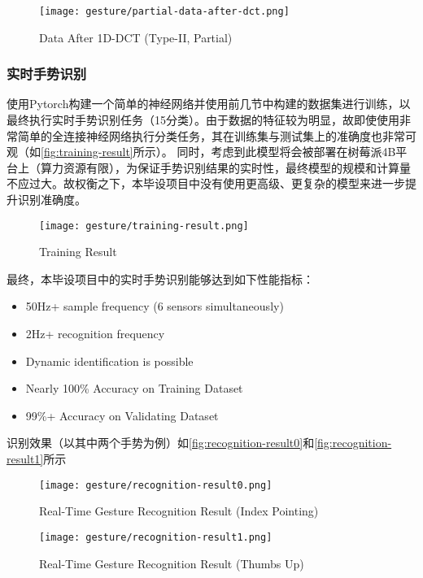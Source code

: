 \begin{figure}[H]
    \centering
    \texttt{[image: gesture/partial-data-after-dct.png]}
    \caption{\label{fig:partial-data-after-dct}Data After 1D-DCT (Type-II, Partial)}
\end{figure}

\subsubsection{实时手势识别}
使用Pytorch构建一个简单的神经网络并使用前几节中构建的数据集进行训练，以最终执行实时手势识别任务（15分类）。由于数据的特征较为明显，故即使使用非常简单的全连接神经网络执行分类任务，其在训练集与测试集上的准确度也非常可观（如\autoref{fig:training-result}所示）。
同时，考虑到此模型将会被部署在树莓派4B平台上（算力资源有限），为保证手势识别结果的实时性，最终模型的规模和计算量不应过大。故权衡之下，本毕设项目中没有使用更高级、更复杂的模型来进一步提升识别准确度。

\begin{figure}[H]
    \centering
    \texttt{[image: gesture/training-result.png]}
    \caption{\label{fig:training-result}Training Result}
\end{figure}

最终，本毕设项目中的实时手势识别能够达到如下性能指标：
\begin{itemize}
    \item 50Hz+ sample frequency (6 sensors simultaneously)
    \item 2Hz+ recognition frequency
    \item Dynamic identification is possible
    \item Nearly 100\% Accuracy on Training Dataset
    \item 99\%+ Accuracy on Validating Dataset
\end{itemize}

识别效果（以其中两个手势为例）如\autoref{fig:recognition-result0}和\autoref{fig:recognition-result1}所示

\begin{figure}[H]
    \centering
    \texttt{[image: gesture/recognition-result0.png]}
    \caption{\label{fig:recognition-result0}Real-Time Gesture Recognition Result (Index Pointing)}
\end{figure}

\begin{figure}[H]
    \centering
    \texttt{[image: gesture/recognition-result1.png]}
    \caption{\label{fig:recognition-result1}Real-Time Gesture Recognition Result (Thumbs Up)}
\end{figure}

